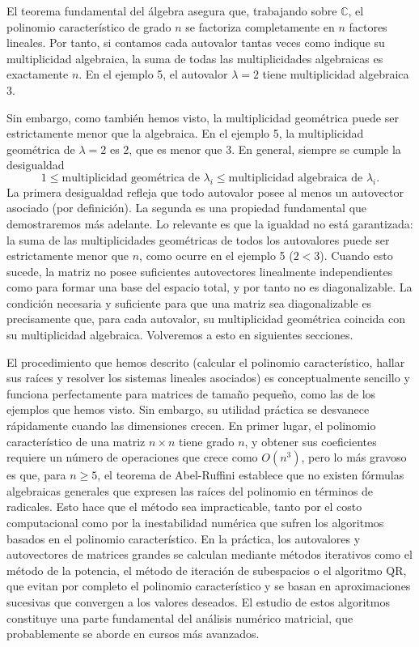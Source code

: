 El teorema fundamental del álgebra asegura que, trabajando sobre $\mathbb{C}$, el polinomio característico de grado $n$ se factoriza completamente en $n$ factores lineales. Por tanto, si contamos cada autovalor tantas veces como indique su multiplicidad algebraica, la suma de todas las multiplicidades algebraicas es exactamente $n$. En el ejemplo 5, el autovalor $\lambda=2$ tiene multiplicidad algebraica $3$.

Sin embargo, como también hemos visto, la multiplicidad geométrica puede ser estrictamente menor que la algebraica. En el ejemplo 5, la multiplicidad geométrica de $\lambda=2$ es $2$, que es menor que $3$. En general, siempre se cumple la desigualdad
\[
1 \le \text{multiplicidad geométrica de } \lambda_i \le \text{multiplicidad algebraica de } \lambda_i.
\]
La primera desigualdad refleja que todo autovalor posee al menos un autovector asociado (por definición). La segunda es una propiedad fundamental que demostraremos más adelante. Lo relevante es que la igualdad no está garantizada: la suma de las multiplicidades geométricas de todos los autovalores puede ser estrictamente menor que $n$, como ocurre en el ejemplo 5 ($2<3$). Cuando esto sucede, la matriz no posee suficientes autovectores linealmente independientes como para formar una base del espacio total, y por tanto no es diagonalizable. La condición necesaria y suficiente para que una matriz sea diagonalizable es precisamente que, para cada autovalor, su multiplicidad geométrica coincida con su multiplicidad algebraica. Volveremos a esto en siguientes secciones.

El procedimiento que hemos descrito (calcular el polinomio característico, hallar sus raíces y resolver los sistemas lineales asociados) es conceptualmente sencillo y funciona perfectamente para matrices de tamaño pequeño, como las de los ejemplos que hemos visto. Sin embargo, su utilidad práctica se desvanece rápidamente cuando las dimensiones crecen. En primer lugar, el polinomio característico de una matriz $n\times n$ tiene grado $n$, y obtener sus coeficientes requiere un número de operaciones que crece como $O(n^3)$, pero lo más gravoso es que, para $n\geq 5$, el teorema de Abel-Ruffini establece que no existen fórmulas algebraicas generales que expresen las raíces del polinomio en términos de radicales. Esto hace que el método sea impracticable, tanto por el costo computacional como por la inestabilidad numérica que sufren los algoritmos basados en el polinomio característico. En la práctica, los autovalores y autovectores de matrices grandes se calculan mediante métodos iterativos como el método de la potencia, el método de iteración de subespacios o el algoritmo QR, que evitan por completo el polinomio característico y se basan en aproximaciones sucesivas que convergen a los valores deseados. El estudio de estos algoritmos constituye una parte fundamental del análisis numérico matricial, que probablemente se aborde en cursos más avanzados.

